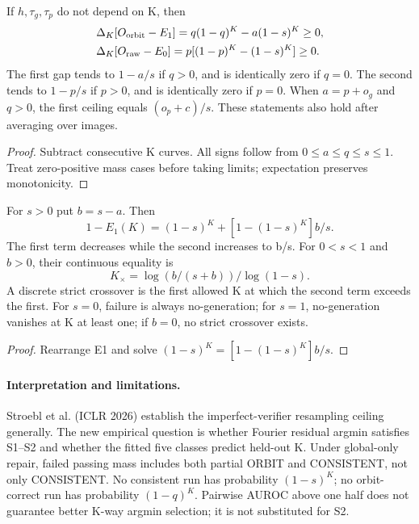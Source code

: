 \begin{theorem}
If \(h,\tau_g,\tau_p\) do not depend on K, then
\[
\begin{aligned}
 &\Delta_K[O_{\rm orbit}-E_1]
   =q(1-q)^K-a(1-s)^K\ge0,\\
 &\Delta_K[O_{\rm raw}-E_0]
   =p[(1-p)^K-(1-s)^K]\ge0.
\end{aligned}
\]
The first gap tends to \(1-a/s\) if \(q>0\), and is identically
zero if \(q=0\). The second tends to \(1-p/s\) if \(p>0\),
and is identically zero if \(p=0\). When \(a=p+o_g\) and
\(q>0\), the first ceiling equals \((o_p+c)/s\).
These statements also hold after averaging over images.
\end{theorem}
\begin{proof}
Subtract consecutive K curves. All signs follow from
\(0\le a\le q\le s\le1\). Treat zero-positive mass cases before
taking limits; expectation preserves monotonicity.
\end{proof}

\begin{proposition}
For \(s>0\) put \(b=s-a\). Then
\[
 1-E_1(K)=(1-s)^K+[1-(1-s)^K]b/s.
\]
The first term decreases while the second increases to b/s.
For \(0<s<1\) and \(b>0\), their continuous equality is
\[
 K_\times=\log(b/(s+b))/\log(1-s).
\]
A discrete strict crossover is the first allowed K at which
the second term exceeds the first. For \(s=0\), failure is
always no-generation; for \(s=1\), no-generation vanishes at
K at least one; if \(b=0\), no strict crossover exists.
\end{proposition}
\begin{proof}
Rearrange E1 and solve
\((1-s)^K=[1-(1-s)^K]b/s\).
\end{proof}

\paragraph{Interpretation and limitations.}
Stroebl et al. (ICLR 2026) establish the imperfect-verifier
resampling ceiling generally. The new empirical question is
whether Fourier residual argmin satisfies S1--S2 and whether
the fitted five classes predict held-out K. Under global-only
repair, failed passing mass includes both partial ORBIT and
CONSISTENT, not only CONSISTENT. No consistent run has probability
\((1-s)^K\); no orbit-correct run has probability \((1-q)^K\).
Pairwise AUROC above one half does not guarantee better K-way
argmin selection; it is not substituted for S2.
